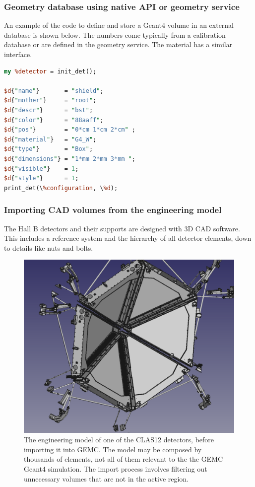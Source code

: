 \subsubsection{Geometry database using native API or geometry service}

An example of the code to define and store a Geant4 volume in an external database is shown below. The
numbers come typically from a calibration database or are defined in the geometry service. The material
has a similar interface.

\begin{lstlisting}[language=Perl]
my %detector = init_det();

$d{"name"}       = "shield";
$d{"mother"}     = "root";
$d{"descr"}      = "bst";
$d{"color"}      = "88aaff";
$d{"pos"}        = "0*cm 1*cm 2*cm" ;
$d{"material"}   = "G4_W";
$d{"type"}       = "Box";
$d{"dimensions"} = "1*mm 2*mm 3*mm ";
$d{"visible"}    = 1;
$d{"style"}      = 1;
print_det(\%configuration, \%d);

\end{lstlisting}


\subsubsection{Importing CAD volumes from the engineering model}

The Hall B detectors and their supports are designed with 3D CAD software. This includes a reference system and the
hierarchy of all detector elements, down to details like nuts and bolts.

\begin{figure}[h]
	\centering
	\includegraphics[width=0.98\columnwidth,keepaspectratio]{img/cadSelection.png}
	\caption{The engineering model of one of the CLAS12 detectors, before importing it into GEMC.
             The model may be composed by thousands of elements, not all of them relevant to the the GEMC Geant4 simulation.
             The import process involves filtering out unnecessary volumes that are not in the active region.}
	\label{fig:cadSelection}
\end{figure}


